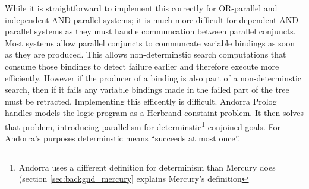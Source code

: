 While it is straightforward to implement this correctly for OR-parallel
and independent AND-parallel systems;
it is much more difficult for dependent AND-parallel systems as
they must handle communcation between parallel conjuncts.
Most systems allow parallel conjuncts to communcate variable bindings as
soon as they are produced.
This allows non-determinstic search computations that consume those bindings to
detect failure earlier and therefore execute more efficiently.
However if the producer of a binding is also part of a non-determinstic
search,
then if it fails any variable bindings made in the failed part of the tree
must be retracted.
Implementing this efficently is difficult.
Andorra Prolog \citep{haridi:1990:andorra} handles models the
logic program as a Herbrand constaint problem.
It then solves that problem, introducing parallelism for
determinstic\footnote{
    Andorra uses a different definition for determinism than Mercury does
    (section \ref{sec:backgnd_mercury} explains Mercury's definition}
conjoined goals.
For Andorra's purposes determinstic means ``succeeds at most once''.

